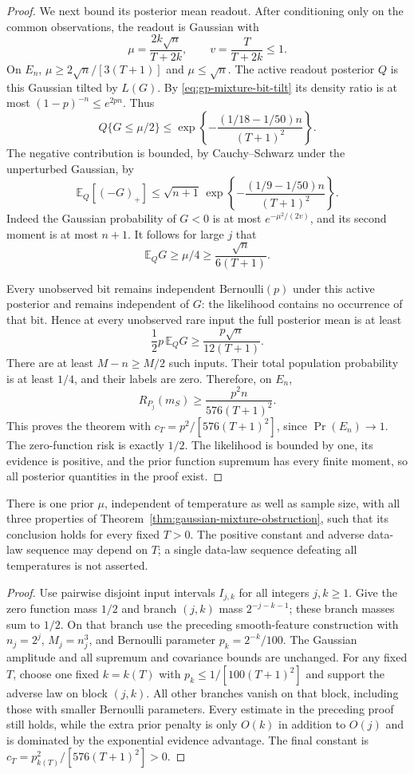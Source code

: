 \begin{proof}
We next bound its posterior mean readout. After conditioning only on the common observations, the readout is Gaussian with
\[
 \mu=\frac{2k\sqrt n}{T+2k},\qquad
 v=\frac T{T+2k}\le1.
\]
On $E_n$, $\mu\ge2\sqrt n/[3(T+1)]$ and $\mu\le\sqrt n$.
The active readout posterior $Q$ is this Gaussian tilted by $L(G)$.
By \eqref{eq:gp-mixture-bit-tilt} its density ratio is at most
$(1-p)^{-n}\le e^{2pn}$. Thus
\[
 Q\{G\le\mu/2\}
 \le\exp\left\{-\frac{(1/18-1/50)n}{(T+1)^2}\right\}.
\]
The negative contribution is bounded, by Cauchy--Schwarz under the unperturbed Gaussian, by
\[
 \mathbb E_Q[(-G)_+]
 \le\sqrt{n+1}\,
       \exp\left\{-\frac{(1/9-1/50)n}{(T+1)^2}\right\}.
\]
Indeed the Gaussian probability of $G<0$ is at most
$e^{-\mu^2/(2v)}$, and its second moment is at most $n+1$.
It follows for large $j$ that
\[
 \mathbb E_QG\ge\mu/4\ge\frac{\sqrt n}{6(T+1)}.
\]

Every unobserved bit remains independent Bernoulli$(p)$ under this active posterior and remains independent of $G$: the likelihood contains no occurrence of that bit. Hence at every unobserved rare input the full posterior mean is at least
\[
 \frac12 p\,\mathbb E_QG
       \ge\frac{p\sqrt n}{12(T+1)}.
\]
There are at least $M-n\ge M/2$ such inputs. Their total population probability is at least $1/4$, and their labels are zero. Therefore, on $E_n$,
\[
 R_{P_j}(m_S)\ge\frac{p^2 n}{576(T+1)^2}.
\]
This proves the theorem with $c_T=p^2/[576(T+1)^2]$, since $\Pr(E_n)\to1$. The zero-function risk is exactly $1/2$. The likelihood is bounded by one, its evidence is positive, and the prior function supremum has every finite moment, so all posterior quantities in the proof exist.
\end{proof}

\begin{corollary}
There is one prior $\mu$, independent of temperature as well as sample
size, with all three properties of
Theorem~\ref{thm:gaussian-mixture-obstruction}, such that its conclusion
holds for every fixed $T>0$. The positive constant and adverse data-law
sequence may depend on $T$; a single data-law sequence defeating all
temperatures is not asserted.
\end{corollary}
\begin{proof}
Use pairwise disjoint input intervals $I_{j,k}$ for all integers
$j,k\ge1$. Give the zero function mass $1/2$ and branch $(j,k)$ mass
$2^{-j-k-1}$; these branch masses sum to $1/2$. On that branch use the
preceding smooth-feature construction with $n_j=2^j$, $M_j=n_j^3$,
and Bernoulli parameter $p_k=2^{-k}/100$. The Gaussian amplitude and
all supremum and covariance bounds are unchanged. For any fixed
$T$, choose one fixed $k=k(T)$ with
$p_k\le1/[100(T+1)^2]$ and support the adverse law on block $(j,k)$.
All other branches vanish on that block, including those with
smaller Bernoulli parameters. Every estimate in the preceding proof
still holds, while the extra prior penalty is only $O(k)$ in
addition to $O(j)$ and is dominated by the exponential evidence
advantage. The final constant is
$c_T=p_{k(T)}^2/[576(T+1)^2]>0$.
\end{proof}


